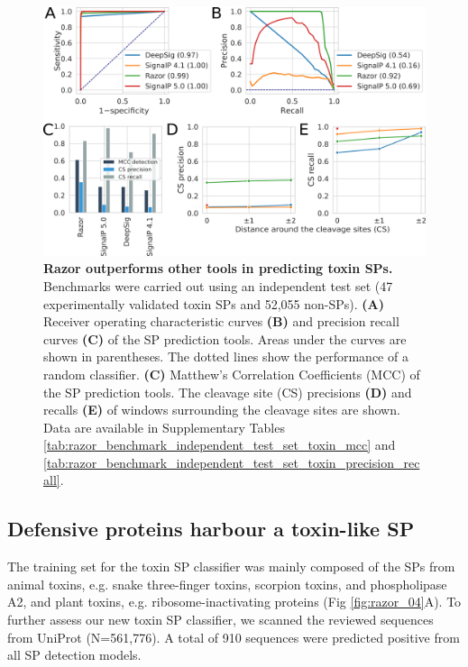 \begin{figure}[!hbtp]
\centerline{\includegraphics[width=1\textwidth]{chapters/Signal_Peptide/Figures/fig3_new_benchmarking_cleavage_sites_with_toxin.png}}
\caption[Razor outperforms other tools in predicting toxin SPs. ]{\textbf{Razor outperforms other tools in predicting toxin SPs. } Benchmarks were carried out using an independent test set (47 experimentally validated toxin SPs and 52,055 non-SPs). \textbf{(A)} Receiver operating characteristic curves \textbf{(B)}  and precision recall curves \textbf{(C)}  of the SP prediction tools. Areas under the curves are shown in parentheses. The dotted lines show the performance of a random classifier. \textbf{(C)}  Matthew’s Correlation Coefficients (MCC) of the SP prediction tools. The cleavage site (CS) precisions \textbf{(D)}  and recalls \textbf{(E)}  of windows surrounding the cleavage sites are shown. Data are available in Supplementary Tables \ref{tab:razor_benchmark_independent_test_set_toxin_mcc} and \ref{tab:razor_benchmark_independent_test_set_toxin_precision_recall}.
}\label{fig:razor_03}
\end{figure}


\subsection{Defensive proteins harbour a toxin-like SP}
The training set for the toxin SP classifier was mainly composed of the SPs from animal toxins, e.g. snake three-finger toxins, scorpion toxins, and phospholipase A2, and plant toxins, e.g. ribosome-inactivating proteins (Fig \ref{fig:razor_04}A). To further assess our new toxin SP classifier, we scanned the reviewed sequences from UniProt (N=561,776). A total of 910 sequences were predicted positive from all SP detection models.

